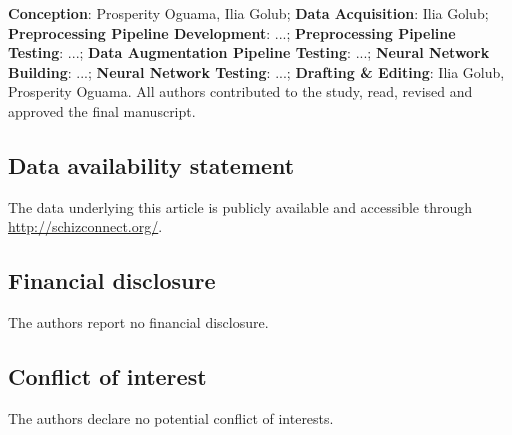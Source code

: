 \textbf{Conception}: Prosperity Oguama, Ilia Golub; \textbf{Data Acquisition}: Ilia Golub; \textbf{Preprocessing Pipeline Development}: ...; \textbf{Preprocessing Pipeline Testing}: ...; \textbf{Data Augmentation Pipeline Testing}: ...; \textbf{Neural Network Building}: ...; \textbf{Neural Network Testing}: ...; \textbf{Drafting \& Editing}: Ilia Golub, Prosperity Oguama. All authors contributed to the study, read, revised and approved the final manuscript.

\subsection*{Data availability statement}
The data underlying this article is publicly available and accessible through \hyperlink{Schizconnect}{http://schizconnect.org/}.

\subsection*{Financial disclosure}

The authors report no financial disclosure.

\subsection*{Conflict of interest}

The authors declare no potential conflict of interests.

